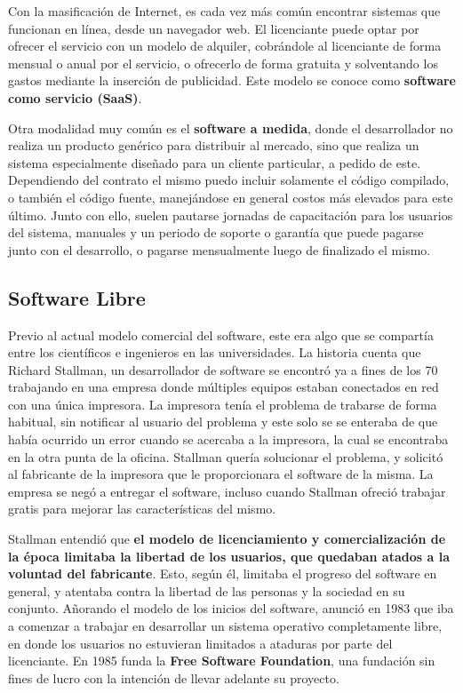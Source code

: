 Con la masificación de Internet, es cada vez más común encontrar sistemas que
funcionan en línea, desde un navegador web. El licenciante puede optar por ofrecer
el servicio con un modelo de alquiler, cobrándole al licenciante de forma
mensual o anual por el servicio, o ofrecerlo de forma gratuita y solventando los
gastos mediante la inserción de publicidad. Este modelo se conoce como \textbf{
software como servicio (SaaS)}.

Otra modalidad muy común es el \textbf{software a medida}, donde el desarrollador
no realiza un producto genérico para distribuir al mercado, sino que realiza un
sistema especialmente diseñado para un cliente particular, a pedido de este.
Dependiendo del contrato el mismo puedo incluir solamente el código compilado,
o también el código fuente, manejándose en general costos más elevados para este
último. Junto con ello, suelen pautarse jornadas de capacitación para los usuarios
del sistema, manuales y un periodo de soporte o garantía que puede pagarse junto
con el desarrollo, o pagarse mensualmente luego de finalizado el mismo.\autocite{saxena_2017}


\subsection{Software Libre}

Previo al actual modelo comercial del software, este era algo que se compartía
entre los científicos e ingenieros en las universidades. La historia cuenta que
Richard Stallman, un desarrollador de software se encontró ya a fines de los
70 trabajando en una empresa donde múltiples equipos estaban conectados en red
con una única impresora. La impresora tenía el problema de trabarse de forma
habitual, sin notificar al usuario del problema y este solo se se enteraba de
que había ocurrido un error cuando se acercaba a la impresora, la cual se
encontraba en la otra punta de la oficina. Stallman quería solucionar el
problema, y solicitó al fabricante de la impresora que le proporcionara el
software de la misma. La empresa se negó a entregar el software, incluso
cuando Stallman ofreció trabajar gratis para mejorar las características del
mismo.

Stallman entendió que \textbf{el modelo de licenciamiento y comercialización
de la época limitaba la libertad de los usuarios, que quedaban atados a la
voluntad del fabricante}. Esto, según él, limitaba el progreso del software en
general, y atentaba contra la libertad de las personas y la sociedad en su
conjunto. Añorando el modelo de los inicios del software, anunció en 1983 que
iba a comenzar a trabajar en desarrollar un sistema operativo completamente libre,
en donde los usuarios no estuvieran limitados a ataduras por parte del licenciante.
En 1985 funda la \textbf{Free Software Foundation}, una fundación sin fines de
lucro con la intención de llevar adelante su proyecto.

